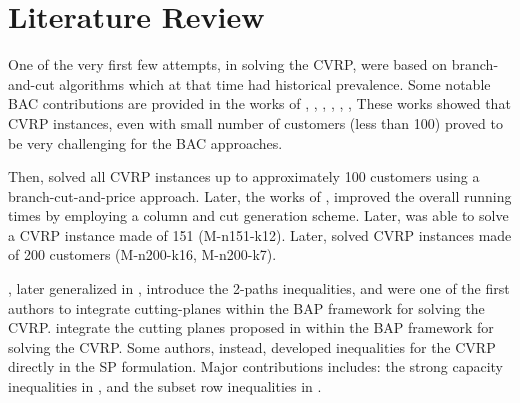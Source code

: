 \section{Literature Review}
\label{sec:intro-literature-review}


One of the very first few attempts, in solving the CVRP, were based on branch-and-cut algorithms
which at that time had historical prevalence.
Some notable BAC contributions are provided in the works of
\textcite{araqueg1994}, \textcite{augerat1995}, \textcite{blasum2000}, \textcite{achuthan2003}, \textcite{ralphs2003}, \textcite{lysgaard2004},
These works showed that CVRP instances, even with small number of customers (less than 100) proved
to be very challenging for the BAC approaches.

Then, \textcite{fukasawa2006} solved all CVRP instances up to approximately 100 customers
using a branch-cut-and-price approach.
Later, the works of \textcite{baldacci2008}, \textcite{baldacci2011}
improved the overall running times by employing a column and cut generation scheme.
Later, \textcite{contardo2014} was able to solve a CVRP instance made of 151 (M-n151-k12).
Later, \textcite{pecin2017} solved CVRP instances made of 200 customers (M-n200-k16, M-n200-k7).


\textcite{kohl1999}, later generalized in \cite{desaulniers2008}, introduce the
2-paths inequalities, and were one of the first authors to integrate
cutting-planes within the BAP framework for solving the CVRP.
\textcite{fukasawa2006} integrate the cutting planes proposed in \cite{lysgaard2004}
within the BAP framework for solving the CVRP.
Some authors, instead, developed inequalities for the CVRP directly
in the SP formulation.
Major contributions includes: the strong capacity inequalities in \textcite{baldacci2008},
and the subset row inequalities in \textcite{jepsen2011}.




\begin{comment}
\cite{jepsen_branch-and-cut_2011}

Before 1980 very few exact algorithms for cvrp and vrptw had been
proposed, but in the early 1980s two new exact methods where proposed.
From this point the history of exact methods for cvrp and vrptw can
be divided into three phases. The first phase was the introduction of the
Set Partition and the development of Branch-and-Cut-and-Price (bp) algo-
rithms using a relaxed pricing problem. The second was the development of
Branch-and-Cut (bac) algorithms. In the current phase the pricing problem
is no longer relaxed and cuts in the master problem of the Branch-and-Cut-
and-Price algorithms is used. The first two phases where started at the same
point in time and there is still development on the algorithms in the context
of cvrp and vrptw. The algorithms from these two phases are also used
on several other variants of the Vehicle Routing Problem. The third phase
was started in the middle of the 2000s and the algorithms from this phase
are currently the best overall performing algorithms.
\end{comment}

